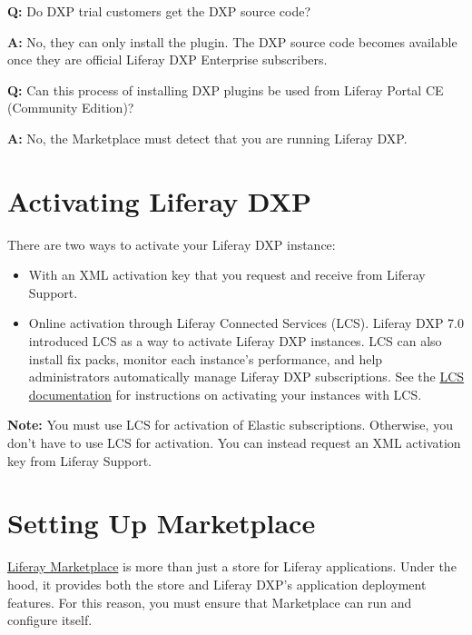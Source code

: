 \textbf{Q:} Do DXP trial customers get the DXP source code?

\textbf{A:} No, they can only install the plugin. The DXP source code
becomes available once they are official Liferay DXP Enterprise
subscribers.

\textbf{Q:} Can this process of installing DXP plugins be used from
Liferay Portal CE (Community Edition)?

\textbf{A:} No, the Marketplace must detect that you are running Liferay
DXP.

\section{Activating Liferay DXP}\label{activating-liferay-dxp}

There are two ways to activate your Liferay DXP instance:

\begin{itemize}
\item
  With an XML activation key that you request and receive from Liferay
  Support.
\item
  Online activation through Liferay Connected Services (LCS). Liferay
  DXP 7.0 introduced LCS as a way to activate Liferay DXP instances. LCS
  can also install fix packs, monitor each instance's performance, and
  help administrators automatically manage Liferay DXP subscriptions.
  See the
  \href{/docs/7-1/deploy/-/knowledge_base/d/managing-liferay-dxp-with-liferay-connected-services}{LCS
  documentation} for instructions on activating your instances with LCS.
\end{itemize}

\noindent\hrulefill

\textbf{Note:} You must use LCS for activation of Elastic subscriptions.
Otherwise, you don't have to use LCS for activation. You can instead
request an XML activation key from Liferay Support.

\noindent\hrulefill

\section{Setting Up Marketplace}\label{setting-up-marketplace}

\href{https://www.liferay.com/marketplace}{Liferay Marketplace} is more
than just a store for Liferay applications. Under the hood, it provides
both the store and Liferay DXP's application deployment features. For
this reason, you must ensure that Marketplace can run and configure
itself.

